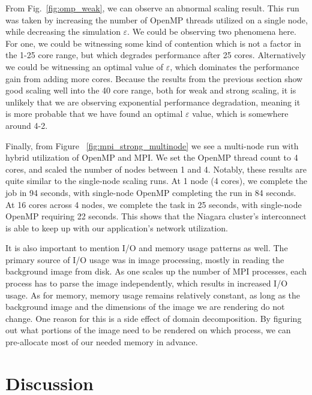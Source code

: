 From Fig.~\ref{fig:omp_weak}, we can observe an abnormal scaling result. This run was taken by increasing the number of OpenMP threads utilized on a single node, while decreasing the simulation $\varepsilon$. We could be observing two phenomena here. For one, we could be witnessing some kind of contention which is not a factor in the 1-25 core range, but which degrades performance after 25 cores. Alternatively we could be witnessing an optimal value of $\varepsilon$, which dominates the performance gain from adding more cores. Because the results from the previous section show good scaling well into the 40 core range, both for weak and strong scaling, it is unlikely that we are observing exponential performance degradation, meaning it is more probable that we have found an optimal $\varepsilon$ value, which is somewhere around 4-2. 

Finally, from Figure ~\ref{fig:mpi_strong_multinode} we see a multi-node run with hybrid utilization of OpenMP and MPI. We set the OpenMP thread count to 4 cores, and scaled the number of nodes between 1 and 4. Notably, these results are quite similar to the single-node scaling runs. At 1 node (4 cores), we complete the job in 94 seconds, with single-node OpenMP completing the run in 84 seconds. At 16 cores across 4 nodes, we complete the task in 25 seconds, with single-node OpenMP requiring 22 seconds. This shows that the Niagara cluster's interconnect is able to keep up with our application's network utilization. 

It is also important to mention I/O and memory usage patterns as well. The primary source of I/O usage was in image processing, mostly in reading the background image from disk. As one scales up the number of MPI processes, each process has to parse the image independently, which results in increased I/O usage. As for memory, memory usage remains relatively constant, as long as the background image and the dimensions of the image we are rendering do not change. One reason for this is a side effect of domain decomposition. By figuring out what portions of the image need to be rendered on which process, we can pre-allocate most of our needed memory in advance.




\section{Discussion}
\label{sec:disc}

